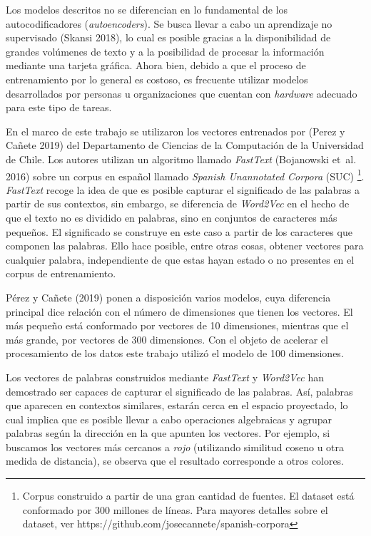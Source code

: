 \documentclass[
  12pt,
]{article}
\begin{document}
Los modelos descritos no se diferencian en lo fundamental de los
autocodificadores (\emph{autoencoders}). Se busca llevar a cabo un
aprendizaje no supervisado (Skansi 2018), lo cual es posible gracias a
la disponibilidad de grandes volúmenes de texto y a la posibilidad de
procesar la información mediante una tarjeta gráfica. Ahora bien, debido
a que el proceso de entrenamiento por lo general es costoso, es
frecuente utilizar modelos desarrollados por personas u organizaciones
que cuentan con \emph{hardware} adecuado para este tipo de tareas.

En el marco de este trabajo se utilizaron los vectores entrenados por
(Perez y Cañete 2019) del Departamento de Ciencias de la Computación de
la Universidad de Chile. Los autores utilizan un algoritmo llamado
\emph{FastText} (Bojanowski et~al. 2016) sobre un corpus en español
llamado \emph{Spanish Unannotated Corpora} (SUC)
\footnote{Corpus construido a partir de una gran cantidad de fuentes. El dataset está conformado por 300 millones de líneas. Para mayores detalles sobre el dataset, ver https://github.com/josecannete/spanish-corpora}.
\emph{FastText} recoge la idea de que es posible capturar el significado
de las palabras a partir de sus contextos, sin embargo, se diferencia de
\emph{Word2Vec} en el hecho de que el texto no es dividido en palabras,
sino en conjuntos de caracteres más pequeños. El significado se
construye en este caso a partir de los caracteres que componen las
palabras. Ello hace posible, entre otras cosas, obtener vectores para
cualquier palabra, independiente de que estas hayan estado o no
presentes en el corpus de entrenamiento.

Pérez y Cañete (2019) ponen a disposición varios modelos, cuya
diferencia principal dice relación con el número de dimensiones que
tienen los vectores. El más pequeño está conformado por vectores de 10
dimensiones, mientras que el más grande, por vectores de 300
dimensiones. Con el objeto de acelerar el procesamiento de los datos
este trabajo utilizó el modelo de 100 dimensiones.

Los vectores de palabras construidos mediante \emph{FastText} y
\emph{Word2Vec} han demostrado ser capaces de capturar el significado de
las palabras. Así, palabras que aparecen en contextos similares, estarán
cerca en el espacio proyectado, lo cual implica que es posible llevar a
cabo operaciones algebraicas y agrupar palabras según la dirección en la
que apunten los vectores. Por ejemplo, si buscamos los vectores más
cercanos a \emph{rojo} (utilizando similitud coseno u otra medida de
distancia), se observa que el resultado corresponde a otros colores.
\end{document}
